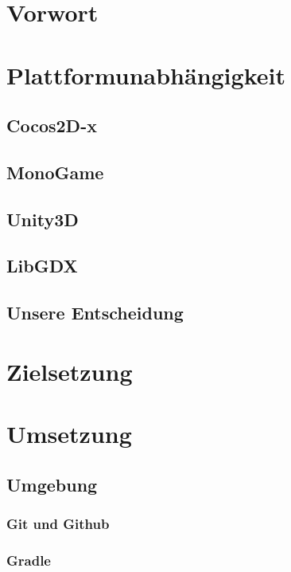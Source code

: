 \section{Vorwort}									\label{sec:V0}		\clearpage
\section{Plattformunabhängigkeit}					\color[rgb]{0,0,0}\label{sec:P1}		
	\subsection{Cocos2D-x}							\label{sec:P2}		
	\subsection{MonoGame}							\label{sec:P3}		
	\subsection{Unity3D}							\label{sec:P4}		
	\subsection{LibGDX}								\label{sec:P5}		
	\subsection{Unsere Entscheidung}				\label{sec:P6}		\clearpage
\section{Zielsetzung}								\label{sec:Z0}		\clearpage
\section{Umsetzung}                                 \label{sec:C0}		
	\subsection{Umgebung}                           \label{sec:U0}		
		\subsubsection{Git und Github}				\label{sec:U1}		\clearpage
		\subsubsection{Gradle}						\label{sec:U2}		\clearpage
